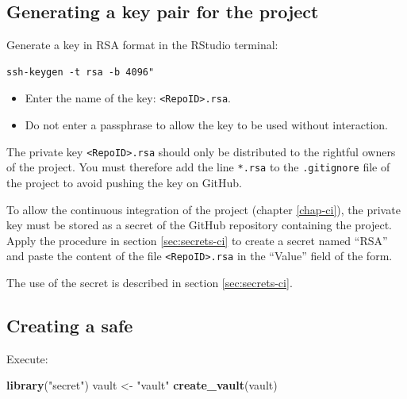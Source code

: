 \documentclass[
  12pt,
  american,
  a4paper,
  extrafontsizes,onecolumn,openright
  ]{memoir}
\newenvironment{Shaded}{\begin{snugshade}}{\end{snugshade}}
\newcommand{\FunctionTok}[1]{\textcolor[rgb]{0.13,0.29,0.53}{\textbf{#1}}}
\newcommand{\NormalTok}[1]{#1}
\newcommand{\OtherTok}[1]{\textcolor[rgb]{0.56,0.35,0.01}{#1}}
\newcommand{\StringTok}[1]{\textcolor[rgb]{0.31,0.60,0.02}{#1}}
\providecommand{\tightlist}{%
  \setlength{\itemsep}{0pt}\setlength{\parskip}{0pt}}
\begin{document}
\subsection{Generating a key pair for the project}\label{generating-a-key-pair-for-the-project}

Generate a key in RSA format in the RStudio terminal:

\begin{verbatim}
ssh-keygen -t rsa -b 4096" 
\end{verbatim}

\begin{itemize}
\tightlist
\item
  Enter the name of the key: \texttt{\textless{}RepoID\textgreater{}.rsa}.
\item
  Do not enter a passphrase to allow the key to be used without interaction.
\end{itemize}

The private key \texttt{\textless{}RepoID\textgreater{}.rsa} should only be distributed to the rightful owners of the project.
You must therefore add the line \texttt{*.rsa} to the \texttt{.gitignore} file of the project to avoid pushing the key on GitHub.

To allow the continuous integration of the project (chapter \ref{chap-ci}), the private key must be stored as a secret of the GitHub repository containing the project.
Apply the procedure in section \ref{sec:secrets-ci} to create a secret named \enquote{RSA} and paste the content of the file \texttt{\textless{}RepoID\textgreater{}.rsa} in the \enquote{Value} field of the form.

The use of the secret is described in section \ref{sec:secrets-ci}.

\subsection{Creating a safe}\label{creating-a-safe}

Execute:

\scriptsize

\begin{Shaded}
\begin{Highlighting}[]
\FunctionTok{library}\NormalTok{(}\StringTok{"secret"}\NormalTok{)}
\NormalTok{vault }\OtherTok{\textless{}{-}} \StringTok{"vault"}
\FunctionTok{create\_vault}\NormalTok{(vault)}
\end{Highlighting}
\end{Shaded}
\end{document}
